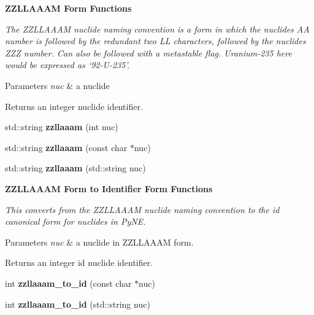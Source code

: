 \begin{Indent}{\bf Z\+Z\+L\+L\+A\+A\+AM Form Functions}\par
{\em The Z\+Z\+L\+L\+A\+A\+AM nuclide naming convention is a form in which the nuclides AA number is followed by the redundant two LL characters, followed by the nuclides Z\+ZZ number. Can also be followed with a metastable flag. Uranium-\/235 here would be expressed as ‘92-\/\+U-\/235’. 
\begin{DoxyParams}{Parameters}
{\em nuc} & a nuclide \\
\hline
\end{DoxyParams}
\begin{DoxyReturn}{Returns}
an integer nuclide identifier. 
\end{DoxyReturn}
}\begin{DoxyCompactItemize}
\item 
std\+::string {\bfseries zzllaaam} (int nuc)\hypertarget{namespacepyne_1_1nucname_ab11175f9aa7d8f9437b3b43531c94a89}{}\label{namespacepyne_1_1nucname_ab11175f9aa7d8f9437b3b43531c94a89}

\item 
std\+::string {\bfseries zzllaaam} (const char $\ast$nuc)\hypertarget{namespacepyne_1_1nucname_abc69b988fbd66fdb21d43c480db4333a}{}\label{namespacepyne_1_1nucname_abc69b988fbd66fdb21d43c480db4333a}

\item 
std\+::string {\bfseries zzllaaam} (std\+::string nuc)\hypertarget{namespacepyne_1_1nucname_a3e184c78ba73f04348963e2158c32a8d}{}\label{namespacepyne_1_1nucname_a3e184c78ba73f04348963e2158c32a8d}

\end{DoxyCompactItemize}
\end{Indent}
\begin{Indent}{\bf Z\+Z\+L\+L\+A\+A\+AM Form to Identifier Form Functions}\par
{\em This converts from the Z\+Z\+L\+L\+A\+A\+AM nuclide naming convention to the id canonical form for nuclides in Py\+NE. 
\begin{DoxyParams}{Parameters}
{\em nuc} & a nuclide in Z\+Z\+L\+L\+A\+A\+AM form. \\
\hline
\end{DoxyParams}
\begin{DoxyReturn}{Returns}
an integer id nuclide identifier. 
\end{DoxyReturn}
}\begin{DoxyCompactItemize}
\item 
int {\bfseries zzllaaam\+\_\+to\+\_\+id} (const char $\ast$nuc)\hypertarget{namespacepyne_1_1nucname_ad979606b90f315c2e9ef958818f96ad8}{}\label{namespacepyne_1_1nucname_ad979606b90f315c2e9ef958818f96ad8}

\item 
int {\bfseries zzllaaam\+\_\+to\+\_\+id} (std\+::string nuc)\hypertarget{namespacepyne_1_1nucname_a55b0daddcb0ff68650685e50c015f960}{}\label{namespacepyne_1_1nucname_a55b0daddcb0ff68650685e50c015f960}

\end{DoxyCompactItemize}
\end{Indent}
